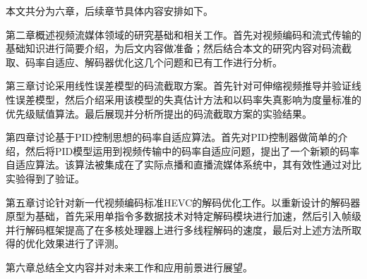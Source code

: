 本文共分为六章，后续章节具体内容安排如下。

第二章概述视频流媒体领域的研究基础和相关工作。首先对视频编码和流式传输的基础知识进行简要介绍，为后文内容做准备；然后结合本文的研究内容对码流截取、码率自适应、解码器优化这几个问题和已有工作进行分析。

第三章讨论采用线性误差模型的码流截取方案。首先针对可伸缩视频推导并验证线性误差模型，然后介绍采用该模型的失真估计方法和以码率失真影响为度量标准的优先级赋值算法。最后展现并分析所提出的码流截取方案的实验结果。

第四章讨论基于PID控制思想的码率自适应算法。首先对PID控制器做简单的介绍，然后将PID模型运用到视频传输中的码率自适应问题，提出了一个新颖的码率自适应算法。该算法被集成在了实际点播和直播流媒体系统中，其有效性通过对比实验得到了验证。

第五章讨论针对新一代视频编码标准HEVC的解码优化工作。以重新设计的解码器原型为基础，首先采用单指令多数据技术对特定解码模块进行加速，然后引入帧级并行解码框架提高了在多核处理器上进行多线程解码的速度，最后对上述方法所取得的优化效果进行了评测。

第六章总结全文内容并对未来工作和应用前景进行展望。